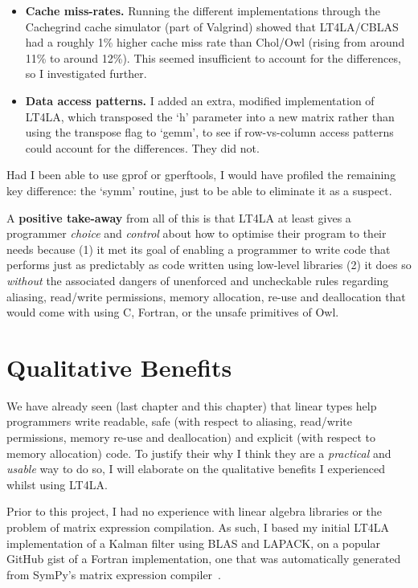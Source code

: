 \begin{itemize}
    
    \item \textbf{Cache miss-rates.}  Running the different implementations
        through the Cachegrind cache simulator (part of Valgrind) showed that
        LT4LA/CBLAS had a roughly 1\% higher cache miss rate than Chol/Owl
        (rising from around 11\% to around 12\%). This seemed insufficient to
        account for the differences, so I investigated further.

    \item \textbf{Data access patterns.} I added an extra, modified
        implementation of LT4LA, which transposed the `h' parameter into a new
        matrix rather than using the transpose flag to `gemm', to see if
        row-vs-column access patterns could account for the differences. They
        did not.

\end{itemize}

Had I been able to use gprof or gperftools, I would have profiled the remaining
key difference: the `symm' routine, just to be able to eliminate it as a
suspect.

A \textbf{positive take-away} from all of this is that LT4LA at least gives a
programmer \emph{choice} and \emph{control} about how to optimise their program
to their needs because (1) it met its goal of enabling a programmer to write
code that performs just as predictably as code written using low-level
libraries (2) it does so \emph{without} the associated dangers of unenforced
and uncheckable rules regarding aliasing, read/write permissions, memory
allocation, re-use and deallocation that would come with using C, Fortran, or
the unsafe primitives of Owl.

\section{Qualitative Benefits}\label{sec:qual_benefits}

We have already seen (last chapter and this chapter) that linear types help
programmers write readable, safe (with respect to aliasing, read/write
permissions, memory re-use and deallocation) and explicit (with respect to
memory allocation) code. To justify their why I think they are a
\emph{practical} and \emph{usable} way to do so, I will elaborate on
the qualitative benefits I experienced whilst using LT4LA.

Prior to this project, I had no experience with linear algebra libraries or the
problem of matrix expression compilation. As such, I based my initial LT4LA
implementation of a Kalman filter using BLAS and LAPACK, on a popular GitHub
gist of a Fortran implementation, one that was automatically generated from
SymPy's matrix expression compiler~\cite{rocklin_thesis}.

